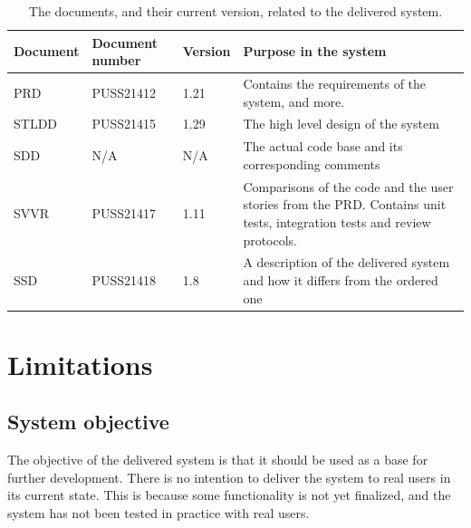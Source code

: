 \documentclass{article}
\begin{document}
\begin{table}[h]
    \centering
    \begin{tabular}{|l|l|l|p{90mm}|}
    \hline
    Document & Document number & Version & Purpose in the system \\
    \hline \hline
    PRD & PUSS21412 & 1.21 & Contains the requirements of the system, and more. \\ \hline
    STLDD & PUSS21415 & 1.29 & The high level design of the system \\ \hline 
    SDD & N/A & N/A & The actual code base and its corresponding comments \\ \hline
    SVVR & PUSS21417 & 1.11 & Comparisons of the code and the user stories from the PRD. Contains unit tests, integration tests and review protocols. \\ \hline
    SSD & PUSS21418 & 1.8 & A description of the delivered system and how it differs from the ordered one \\ \hline
    \end{tabular}
    \caption{The documents, and their current version, related to the delivered system.}
    \label{tab:deliveredSys}
\end{table}


\section{Limitations}

\subsection{System objective} %

The objective of the delivered system is that it should be used as a base for further development. There is no intention to deliver the system to real users in its current state. This is because some functionality is not yet finalized, and the system has not been tested in practice with real users.
\end{document}
